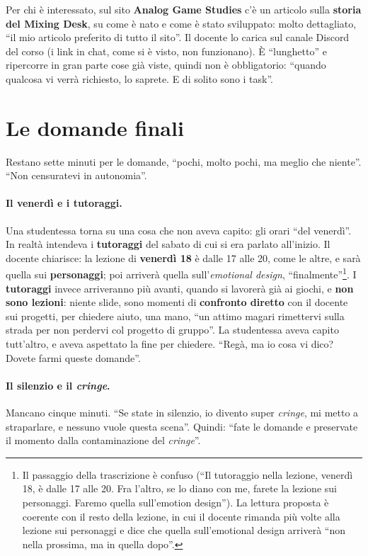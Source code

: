 Per chi è interessato, sul sito \textbf{Analog Game Studies} c'è un articolo
sulla \textbf{storia del Mixing Desk}, su come è nato e come è stato sviluppato:
molto dettagliato, ``il mio articolo preferito di tutto il sito''. Il docente lo
carica sul canale Discord del corso (i link in chat, come si è visto, non
funzionano). È ``lunghetto'' e ripercorre in gran parte cose già viste, quindi
non è obbligatorio: ``quando qualcosa vi verrà richiesto, lo saprete. E di solito
sono i task''.

\section{Le domande finali}
\label{a3:sec:domande}

Restano sette minuti per le domande, ``pochi, molto pochi, ma meglio che
niente''. ``Non censuratevi in autonomia''.

\paragraph{Il venerdì e i tutoraggi.} Una studentessa torna su una cosa che non
aveva capito: gli orari ``del venerdì''. In realtà intendeva i
\textbf{tutoraggi} del sabato di cui si era parlato all'inizio. Il docente
chiarisce: la lezione di \textbf{venerdì 18} è dalle 17 alle 20, come le altre,
e sarà quella sui \textbf{personaggi}; poi arriverà quella sull'\emph{emotional
design}, ``finalmente''\footnote{Il passaggio della trascrizione è confuso
(``Il tutoraggio nella lezione, venerdì 18, è dalle 17 alle 20. Fra l'altro, se
lo diano con me, farete la lezione sui personaggi. Faremo quella sull'emotion
design''). La lettura proposta è coerente con il resto della lezione, in cui il
docente rimanda più volte alla lezione sui personaggi e dice che quella
sull'emotional design arriverà ``non nella prossima, ma in quella dopo''.}. I
\textbf{tutoraggi} invece arriveranno più avanti, quando si lavorerà già ai
giochi, e \textbf{non sono lezioni}: niente slide, sono momenti di
\textbf{confronto diretto} con il docente sui progetti, per chiedere aiuto, una
mano, ``un attimo magari rimettervi sulla strada per non perdervi col progetto
di gruppo''. La studentessa aveva capito tutt'altro, e aveva aspettato la fine
per chiedere. ``Regà, ma io cosa vi dico? Dovete farmi queste domande''.

\paragraph{Il silenzio e il \emph{cringe}.} Mancano cinque minuti. ``Se state in
silenzio, io divento super \emph{cringe}, mi metto a straparlare, e nessuno vuole
questa scena''. Quindi: ``fate le domande e preservate il momento dalla
contaminazione del \emph{cringe}''.

